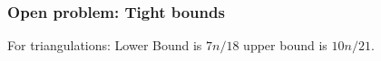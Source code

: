\documentclass{beamer}
\begin{document}
\begin{frame}
  \frametitle{Open problem: Tight bounds}

  For triangulations: Lower Bound is $7n/18 $ upper bound is $10n/21$.
\end{frame}

%
%
%
%
%
%
%
%
%

\begin{frame}


\end{frame}
\end{document}
